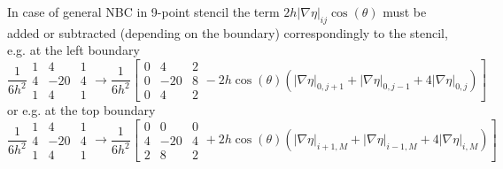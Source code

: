 In case of general NBC in 9-point stencil the term $2h|\nabla\eta|_{ij}\cos(\theta) $ must be added or subtracted (depending on the boundary) correspondingly to the stencil, e.g. at the left boundary
\begin{equation}
	\frac{1}{6h^2}\begin{array}{c|c|c}
		1&4&1  \\ \hline
		4&-20&4 \\ \hline
		1&4&1
	\end{array} \rightarrow  
	\frac{1}{6h^2} \left[\begin{array}{c|c|c}
		0&4&2  \\ \hline
		0&-20&8 \\ \hline
		0&4&2
	\end{array} - 2h\cos(\theta)(|\nabla\eta|_{0,j+1} + |\nabla\eta|_{0,j-1} + 4|\nabla\eta|_{0,j}) \right]
\end{equation}
or e.g. at the top boundary
\begin{equation}
	\frac{1}{6h^2}\begin{array}{c|c|c}
		1&4&1  \\ \hline
		4&-20&4 \\ \hline
		1&4&1
	\end{array} \rightarrow  
	\frac{1}{6h^2} \left[\begin{array}{c|c|c}
		0&0&0  \\ \hline
		4&-20&4 \\ \hline
		2&8&2
	\end{array} + 2h\cos(\theta)(|\nabla\eta|_{i+1,M} + |\nabla\eta|_{i-1,M} + 4|\nabla\eta|_{i,M}) \right]
\end{equation}

